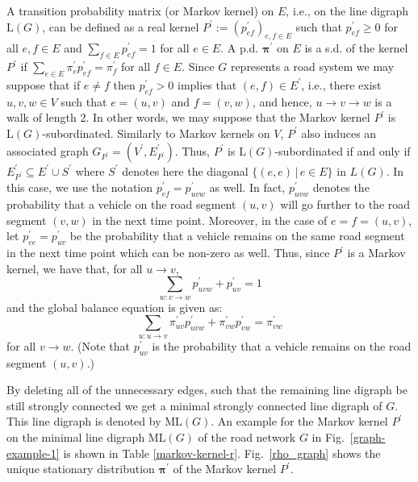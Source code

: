 \documentclass[b5paper,12pt]{report}
\theoremstyle{definition}
\newcommand{\bpi}{\boldsymbol{\pi}}
\begin{document}
A transition probability matrix (or Markov kernel) on $E$, i.e., on the line digraph $\text{L}(G)$, can be defined as a real kernel $P^\prime:=(p^\prime_{ef})_{e,f\in E}$ such that $p^\prime_{ef}\ge 0$ for all $e,f\in E$ and $\sum_{f\in E}p^\prime_{ef} = 1$ for all $e\in E$. A p.d. $\bpi^\prime$ on $E$ is a s.d. of the kernel $P^\prime$ if $\sum_{e\in E} \pi^\prime_e p^\prime_{ef} = \pi^\prime_f$ for all $f\in E$. Since $G$ represents a road system we may suppose that if $e\neq f$ then $p^\prime_{ef}>0$ implies that $(e,f)\in E^\prime$, i.e., there exist $u,v,w\in V$ such that $e=(u,v)$ and $f=(v,w)$, and hence, $u\rightarrow v\rightarrow w$ is a walk of length 2. In other words, we may suppose that the Markov kernel $P^\prime$ is $\text{L}(G)$-subordinated. Similarly to Markov kernels on $V$, $P^\prime$ also induces an associated graph $G_{P^\prime}=(V^\prime,E^\prime_{P^\prime})$. Thus, $P^\prime$ is $\text{L}(G)$-subordinated if and only if $E^\prime_{P^\prime}\subseteq E^\prime\cup S^\prime$ where $S^\prime$ denotes here the diagonal $\{(e,e)\,|\, e\in E\}$ in $L(G)$. In this case, we use the notation $p^\prime_{ef}=p^\prime_{uvw}$ as well. In fact, $p^\prime_{uvw}$ denotes the probability that a vehicle on the road segment $(u,v)$ will go further to the road segment $(v,w)$ in the next time point. Moreover, in the case of $e=f=(u,v)$, let $p^\prime_{ee}=p^\prime_{uv}$ be the probability that a vehicle remains on the same road segment  in the next time point which can be non-zero as well. Thus, since $P^\prime$ is a Markov kernel, we have that, for all $u\rightarrow v$,
\begin{equation}\label{Rsum}
\sum_{w:v\rightarrow w} p^\prime_{uvw} + p^\prime_{uv} =1
\end{equation}
and the global balance equation is given as:
\begin{equation}\label{rho_eq}
            \sum_{u:u\rightarrow v} \pi^\prime_{uv} p^\prime_{uvw} + \pi^\prime_{vw} p^\prime_{vw} = \pi^\prime_{vw}
\end{equation}
for all $v\rightarrow w$. (Note that $p^\prime_{uv}$ is the probability that a vehicle remains on the road segment $(u,v)$.)

By deleting all of the unnecessary edges, such that the remaining line digraph be still strongly connected we get a minimal strongly connected line digraph of $G$. This line digraph is denoted by $\text{ML} (G)$. An example for the Markov kernel $P^\prime$ on the minimal line digraph $\text{ML}(G)$ of the road network $G$ in Fig.~\ref{graph-example-1} is shown in Table \ref{markov-kernel-r}. Fig.~\ref{rho_graph} shows the unique stationary distribution $\bpi^\prime$ of the Markov kernel $P^\prime$.
\end{document}
